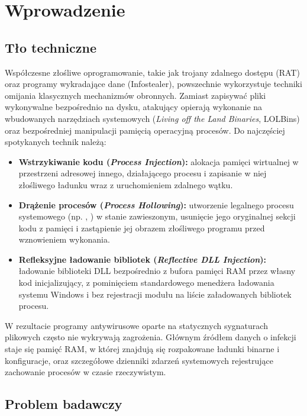 \chapter{Wprowadzenie}\label{ch:wprowadzenie}

\section{Tło techniczne}\label{sec:tlo_techniczne}

Współczesne złośliwe oprogramowanie, takie jak trojany zdalnego dostępu (RAT) oraz programy wykradające dane (Infostealer), powszechnie wykorzystuje techniki omijania klasycznych mechanizmów obronnych. Zamiast zapisywać pliki wykonywalne bezpośrednio na dysku, atakujący opierają wykonanie na wbudowanych narzędziach systemowych (\textit{Living off the Land Binaries}, LOLBins) oraz bezpośredniej manipulacji pamięcią operacyjną procesów. Do najczęściej spotykanych technik należą:
\begin{itemize}
    \item \textbf{Wstrzykiwanie kodu (\textit{Process Injection}):} alokacja pamięci wirtualnej w przestrzeni adresowej innego, działającego procesu i zapisanie w niej złośliwego ładunku wraz z uruchomieniem zdalnego wątku.
    \item \textbf{Drążenie procesów (\textit{Process Hollowing}):} utworzenie legalnego procesu systemowego (np. , ) w stanie zawieszonym, usunięcie jego oryginalnej sekcji kodu z pamięci i zastąpienie jej obrazem złośliwego programu przed wznowieniem wykonania.
    \item \textbf{Refleksyjne ładowanie bibliotek (\textit{Reflective DLL Injection}):} ładowanie biblioteki DLL bezpośrednio z bufora pamięci RAM przez własny kod inicjalizujący, z pominięciem standardowego menedżera ładowania systemu Windows i bez rejestracji modułu na liście załadowanych bibliotek procesu.
\end{itemize}

W rezultacie programy antywirusowe oparte na statycznych sygnaturach plikowych często nie wykrywają zagrożenia. Głównym źródłem danych o infekcji staje się pamięć RAM, w której znajdują się rozpakowane ładunki binarne i konfiguracje, oraz szczegółowe dzienniki zdarzeń systemowych rejestrujące zachowanie procesów w czasie rzeczywistym.

\section{Problem badawczy}\label{sec:problem_badawczy}

